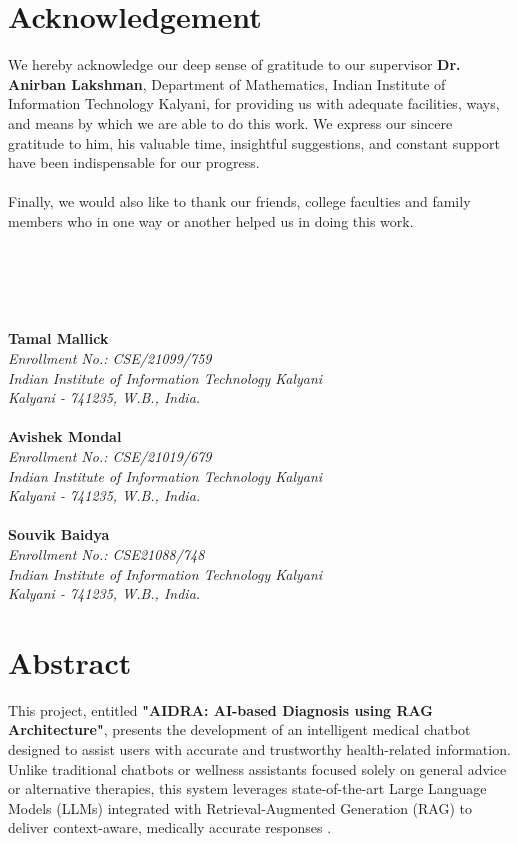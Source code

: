 \documentclass[12pt,a4paper]{report}
\newcommand{\mytitle}{AIDRA: AI-based Diagnosis using RAG Architecture}
\begin{document}
			\chapter*{\centering Acknowledgement}
We hereby acknowledge our deep sense of gratitude to our supervisor \textbf{Dr. Anirban Lakshman}, Department of Mathematics, Indian Institute of Information Technology Kalyani, for providing us with adequate facilities, ways, and means by which we are able to do this work. We express our sincere gratitude to him, his valuable time, insightful suggestions, and constant support have been indispensable for our progress.\\
\\
	Finally, we would also like to thank our friends, college faculties and family members who in one way or another helped us in doing this work.\\
\\
\\
\\
\\
\\
\noindent
\textbf{Tamal Mallick} \\
\textit{Enrollment No.: CSE/21099/759 \\
Indian Institute of Information Technology Kalyani \\
Kalyani - 741235, W.B., India.} \\[1em]
\\[1.2cm]
\noindent
\textbf{Avishek Mondal} \\
\textit{Enrollment No.: CSE/21019/679 \\
Indian Institute of Information Technology Kalyani \\
Kalyani - 741235, W.B., India.} \\[1em]
\\[1.2cm]
\noindent
\textbf{Souvik Baidya} \\
\textit{Enrollment No.: CSE21088/748 \\
Indian Institute of Information Technology Kalyani \\
Kalyani - 741235, W.B., India.}


\cleardoublepage
\chapter*{\centering Abstract}
\label{Abstract}

This project, entitled \textbf{"\mytitle"}, presents the development of an intelligent medical chatbot designed to assist users with accurate and trustworthy health-related information. Unlike traditional chatbots or wellness assistants focused solely on general advice or alternative therapies, this system leverages state-of-the-art Large Language Models (LLMs) integrated with Retrieval-Augmented Generation (RAG) to deliver context-aware, medically accurate responses \cite{chatgpt, langchain}.
\end{document}
